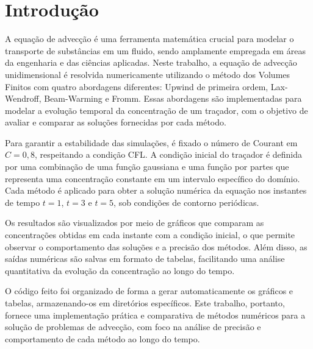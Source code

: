 \section{Introdução}

A equação de advecção é uma ferramenta matemática crucial para modelar o transporte de substâncias em um fluido, sendo amplamente empregada em áreas da engenharia e das ciências aplicadas. Neste trabalho, a equação de advecção unidimensional é resolvida numericamente utilizando o método dos Volumes Finitos com quatro abordagens diferentes: Upwind de primeira ordem, Lax-Wendroff, Beam-Warming e Fromm. Essas abordagens são implementadas para modelar a evolução temporal da concentração de um traçador, com o objetivo de avaliar e comparar as soluções fornecidas por cada método.

Para garantir a estabilidade das simulações, é fixado o número de Courant em $C = 0,8$, respeitando a condição CFL. A condição inicial do traçador é definida por uma combinação de uma função gaussiana e uma função por partes que representa uma concentração constante em um intervalo específico do domínio. Cada método é aplicado para obter a solução numérica da equação nos instantes de tempo $t=1$, $t=3$ e $t=5$, sob condições de contorno periódicas.

Os resultados são visualizados por meio de gráficos que comparam as concentrações obtidas em cada instante com a condição inicial, o que permite observar o comportamento das soluções e a precisão dos métodos. Além disso, as saídas numéricas são salvas em formato de tabelas, facilitando uma análise quantitativa da evolução da concentração ao longo do tempo.

O código feito foi organizado de forma a gerar automaticamente os gráficos e tabelas, armazenando-os em diretórios específicos. Este trabalho, portanto, fornece uma implementação prática e comparativa de métodos numéricos para a solução de problemas de advecção, com foco na análise de precisão e comportamento de cada método ao longo do tempo.
